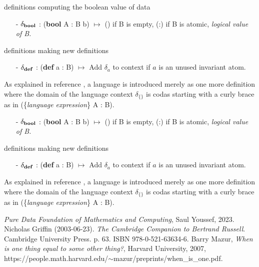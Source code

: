 \documentclass[11pt]{article}
\begin{document}
definitions computing the boolean value of data 
\begin{enumerate}
\item[-]{$\delta_{\bf bool}$ : ({\bf bool} A : B b) $\mapsto$ () if B is empty, (:) if B is atomic, {\it logical value of B.}}
\end{enumerate}
definitions making new definitions  
\begin{enumerate}
\item[-]{$\delta_{\bf def}$ : ({\bf def} a : B) $\mapsto$ Add $\delta_a$ to context if $a$ is an unused invariant atom.} 
\end{enumerate}
As explained in reference \cite{PDF}, a language is introduced merely as one more definition where the domain of the language context $\delta_{\{\}}$ is 
codas starting with a curly brace as in (\{{\it language expression}\} A : B).  
\begin{enumerate}
\item[-]{$\delta_{\bf bool}$ : ({\bf bool} A : B b) $\mapsto$ () if B is empty, (:) if B is atomic, {\it logical value of B.}}
\end{enumerate}
definitions making new definitions  
\begin{enumerate}
\item[-]{$\delta_{\bf def}$ : ({\bf def} a : B) $\mapsto$ Add $\delta_a$ to context if $a$ is an unused invariant atom.} 
\end{enumerate}
As explained in reference \cite{PDF}, a language is introduced merely as one more definition where the domain of the language context $\delta_{\{\}}$ is 
codas starting with a curly brace as in (\{{\it language expression}\} A : B).  

\begin{thebibliography}{10}
 {\it Pure Data Foundation of Mathematics and Computing}, Saul Youssef, 2023.
 Nicholas Griffin (2003-06-23). {\it The Cambridge Companion to Bertrand Russell}. Cambridge University Press. p. 63. ISBN 978-0-521-63634-6.
 Barry Mazur, {\it When is one thing equal to some other thing?}, Harvard University, 2007,  {\rm https://people.math.harvard.edu/}$\sim${\rm mazur/preprints/when\_is\_one.pdf}. 
\end{thebibliography}
\end{document}

